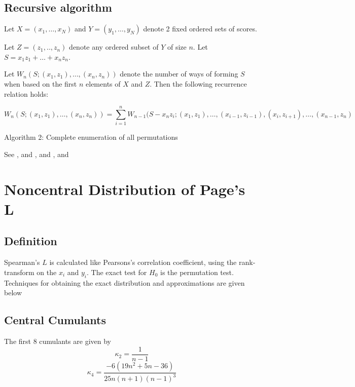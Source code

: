 \subsection{Recursive algorithm}
Let $X=(x_1,\ldots,x_N)$ and $Y=(y_1,\ldots,y_N)$ denote 2 fixed ordered sets of scores. 

Let $Z=(z_1 ,..,z_n)$ denote any ordered subset of $Y$ of size $n$. Let $S = x_1z_1 + \ldots + x_nz_n$. 

Let $W_n(S; (x_1,z_1),\ldots,(x_n,z_n))$ denote the number of ways of forming $S$ when based on the first $n$ elements of $X$ and $Z$. Then the following recurrence relation holds:

\begin{equation}
	W_n(S;(x_1,z_1),\ldots,(x_n,z_n)) = \sum_{i=1}^n W_{n-1}(S-x_nz_i;(x_1,z_1),\ldots,(x_{i-1},z_{i-1}),(x_i,z_{i+1}),\ldots,(x_{n-1},z_n)
\end{equation}

Algorithm 2: Complete enumeration of all permutations

See \cite{vandeWiel_2001}, and \cite{Iman_1975}, and \cite{Koning1988}, and \cite{Lee_1992}




\newpage
\section{Noncentral Distribution of Page's L}


\subsection{Definition}
\label{SpearmanLDistributionDefinition}

Spearman's $L$ is calculated like Pearsons's correlation coefficient, using the rank-transform on the $x_i$ and $y_i$. The exact test for $H_0$ is the permutation test. Techniques for obtaining the exact distribution and approximations are given below



\subsection{Central Cumulants}
The first 8 cumulants are given by \citep{David_1951}
\begin{equation}
	\kappa_2 = \frac{1}{n-1}
\end{equation}
\begin{equation}
	\kappa_4 = \frac{-6(19n^2+5n-36)}{25n(n+1)(n-1)^3}
\end{equation}

